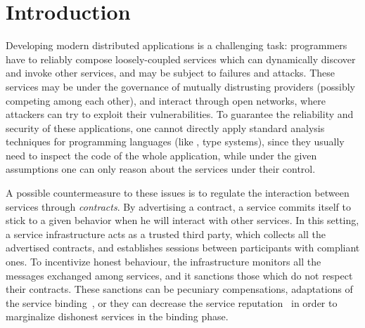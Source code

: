 \section{Introduction}


Developing modern distributed applications 
is a challenging task:
programmers have to reliably compose loosely-coupled services
which can dynamically discover and invoke other services,
and may be subject to failures and attacks.
These services may be under the governance of mutually distrusting providers 
(possibly competing among each other), 
and interact through open networks, %
where attackers can try to exploit their vulnerabilities. %
%
To guarantee the reliability and security of these applications,
one cannot directly apply standard analysis techniques for programming languages
(like \eg, type systems), 
since they usually need to inspect the code of the whole application,
while under the given assumptions one can only %
reason about the services under their control. %

A possible countermeasure to these issues is to regulate the interaction
between services through \emph{contracts}.
By advertising a contract, a service commits itself
to stick to a given behavior when he will interact with other services.
In this setting, a service infrastructure acts as a trusted third party, 
which collects all the advertised contracts, and establishes sessions
between participants with compliant ones. %
To incentivize honest behaviour,
the infrastructure monitors all the messages exchanged among services,
and it sanctions those which do not respect their contracts.
These sanctions can be pecuniary compensations,
adaptations of the service binding~\cite{Mukhija2007qos},
or they can decrease the service reputation~\cite{CO2middleware}
in order to marginalize dishonest services in the binding phase.



